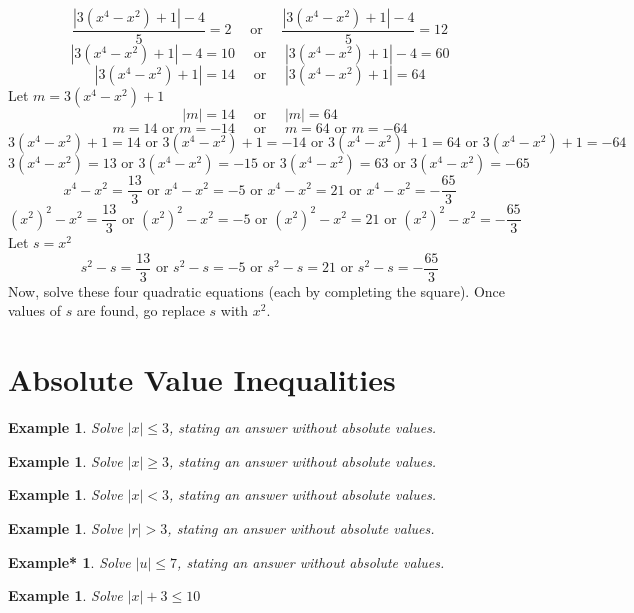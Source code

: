 \documentclass[twoside]{tufte-handout}
\newcommand{\booksection}{0}
\newcommand{\pageheader}{}
\newcounter{ekcounter}%
\theoremstyle{ekimcustom}
\newtheorem{exm}[ekcounter]{Example}
\newtheorem{exmref}[ekcounter]{Example*}
\begin{document}
\[\frac{|3(x^4-x^2)+1|-4}{5}=2 \quad\text{ or }\quad \frac{|3(x^4-x^2)+1|-4}{5}=12\]
\[|3(x^4-x^2)+1|-4=10 \quad\text{ or }\quad |3(x^4-x^2)+1|-4=60\]
\[|3(x^4-x^2)+1|=14 \quad\text{ or }\quad |3(x^4-x^2)+1|=64\]
 Let $m=3(x^4-x^2)+1$
\[|m|=14 \quad \text{ or } \quad |m|=64\]
\[m=14 \text{ or } m = -14 \quad \text{ or } \quad m=64 \text{ or } m = -64\]
 {\footnotesize\[3(x^4-x^2)+1=14 \text{ or } 3(x^4-x^2)+1 = -14  \text{ or }  3(x^4-x^2)+1=64 \text{ or } 3(x^4-x^2)+1 = -64\]}
 {\[3(x^4-x^2)=13 \text{ or } 3(x^4-x^2) = -15  \text{ or }  3(x^4-x^2)=63 \text{ or } 3(x^4-x^2) = -65\]}
 {\[x^4-x^2=\frac{13}{3} \text{ or } x^4-x^2 = -5  \text{ or }  x^4-x^2=21 \text{ or } x^4-x^2 = -\frac{65}{3}\]}
 {\[(x^2)^2-x^2=\frac{13}{3} \text{ or } (x^2)^2-x^2 = -5  \text{ or }  (x^2)^2-x^2=21 \text{ or } (x^2)^2-x^2 = -\frac{65}{3}\]}
 Let $s=x^2$
 {\[s^2-s=\frac{13}{3} \text{ or } s^2-s = -5  \text{ or } s^2-s=21 \text{ or } s^2-s = -\frac{65}{3}\]}
Now, solve these four quadratic equations (each by completing the square). Once values of $s$ are found, go replace $s$ with $x^2$.



\renewcommand{\booksection}{Absolute Value Inequalities}
\renewcommand{\pageheader}{\booksection }
\section*{\LARGE \pageheader}

\everymath{\displaystyle}
\begin{exm}{}Solve  $|x| \leq 3$, stating an answer without absolute values.
\end{exm}\vskip10pt
\begin{exm}{}Solve  $|x| \geq 3$, stating an answer without absolute values.
\end{exm}\vskip10pt
\begin{exm}{}Solve  $|x| < 3$, stating an answer without absolute values.
\end{exm}\vskip10pt
\begin{exm}{}Solve  $|r| > 3$, stating an answer without absolute values.
\end{exm}\vskip10pt
\begin{exmref}\label{uleq7}Solve  $|u| \leq 7$, stating an answer without absolute values.
\end{exmref}\vskip10pt


\begin{exm}{}Solve  $|x| + 3 \leq 10$
\end{exm}\vskip10pt
\end{document}
